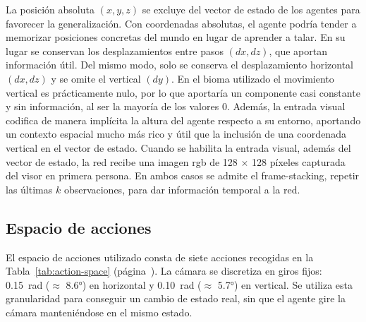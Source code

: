 La posición absoluta $(x, y, z)$ se excluye del vector de estado de los agentes
para favorecer la generalización. Con coordenadas absolutas, el agente podría tender a memorizar posiciones
concretas del mundo en lugar de aprender a talar. En su lugar se conservan los
desplazamientos entre pasos $(dx, dz)$, que aportan información útil.
Del mismo modo, solo se conserva el desplazamiento horizontal $(dx, dz)$ y se omite el vertical $(dy)$.
En el \gls{bioma} utilizado el movimiento vertical es prácticamente nulo, por lo que aportaría un
componente casi constante y sin información, al ser la mayoría de los valores 0. Además, la entrada visual 
codifica de manera implícita la altura del agente respecto a su entorno, 
aportando un contexto espacial mucho más rico y útil que la inclusión de una coordenada vertical en el vector de estado.
Cuando se habilita la entrada visual, además del vector de estado, la red recibe una imagen \acrshort{rgb} de
\num{128} $\times$ \num{128} píxeles capturada del visor en primera persona.
En ambos casos se admite el \gls{frame-stacking}, repetir las últimas
$k$ observaciones, para dar información temporal a la red.

\subsection{Espacio de acciones}
El espacio de acciones utilizado consta de siete acciones recogidas en la
Tabla~\ref{tab:action-space} (página~\pageref{tab:action-space}).
La cámara se discretiza en giros fijos: \qty{0.15}{rad} ($\approx$ \ang{8.6})
en horizontal y \qty{0.10}{rad} ($\approx$ \ang{5.7}) en vertical. Se utiliza esta
granularidad para conseguir un cambio de estado real, sin que el agente gire la cámara manteniéndose en el mismo estado.

\begin{table}[htbp]
  \centering
  \caption[Espacio de acciones discreto]{Espacio de acciones discreto.}
  \label{tab:action-space}
\end{table}


